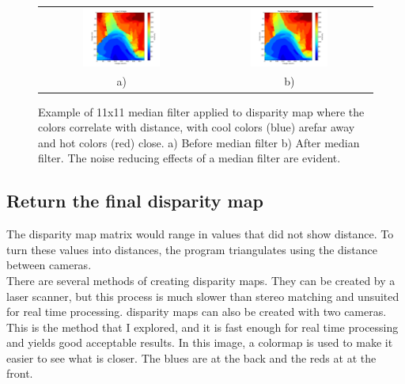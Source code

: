\documentclass[11pt,fleqn]{article}
\begin{document}
\newpage
\begin{figure}[!ht]
\begin{mdframed}
\centering
\begin{tabular}{cc}
\includegraphics[width=0.49\textwidth, trim=60 10 25 10, clip]{images/median1.png} &
\includegraphics[width=0.49\textwidth, trim=60 10 25 10, clip]{images/median2.png}\\[2pt]
a) & b) \\
\end{tabular}
\caption[Example of 11x11 median filter applied to disparity map]{Example of 11x11 median filter applied to disparity map where the colors correlate with distance, with cool colors (blue) arefar away and hot colors (red) close. a) Before median filter b) After median filter. 
The noise reducing effects of a median filter are evident.}
\label{fig:medians}
\end{mdframed}
\end{figure}

\subsection{Return the final disparity map}

The disparity map matrix would range in values that did not show distance. To turn these values into distances, the program triangulates using the distance between cameras.\\[5pt]
%
There are several methods of creating disparity maps.
They can be created by a laser scanner, but this process is much slower than stereo matching and unsuited for real time processing. disparity maps can also be created with two cameras. This is the method that I explored, and it is fast enough for real time processing and yields good acceptable results. In this image, a colormap is used to make it easier to see what is closer. The blues are at the back and the reds at at the front.
\end{document}
